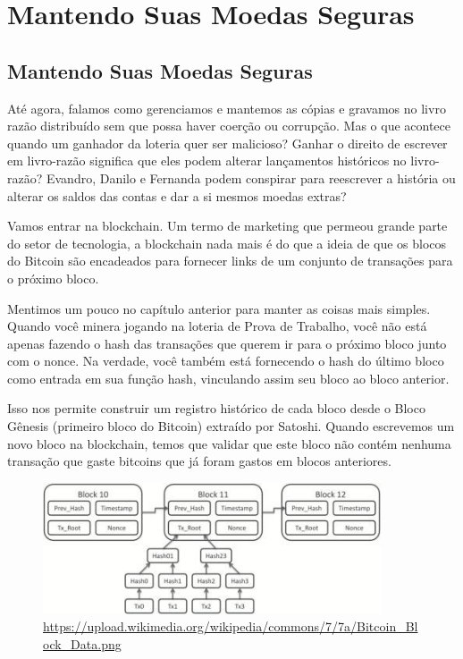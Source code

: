 \part{Mantendo Suas Moedas Seguras}
\label{ch:capitulo6}
\chapter*{Mantendo Suas Moedas Seguras}

Até agora, falamos como gerenciamos e mantemos as cópias e gravamos no livro razão distribuído sem que possa haver coerção ou corrupção. Mas o que acontece quando um ganhador da loteria quer ser malicioso? Ganhar o direito de escrever em livro-razão significa que eles podem alterar lançamentos históricos no livro-razão? Evandro, Danilo e Fernanda podem conspirar para reescrever a história ou alterar os saldos das contas e dar a si mesmos moedas extras?

Vamos entrar na blockchain. Um termo de marketing que permeou grande parte do setor de tecnologia, a blockchain nada mais é do que a ideia de que os blocos do Bitcoin são encadeados para fornecer links de um conjunto de transações para o próximo bloco.

Mentimos um pouco no capítulo anterior para manter as coisas mais simples. Quando você minera jogando na loteria de Prova de Trabalho, você não está apenas fazendo o hash das transações que querem ir para o próximo bloco junto com o nonce. Na verdade, você também está fornecendo o hash do último bloco como entrada em sua função hash, vinculando assim seu bloco ao bloco anterior.

Isso nos permite construir um registro histórico de cada bloco desde o Bloco Gênesis (primeiro bloco do Bitcoin) extraído por Satoshi. Quando escrevemos um novo bloco na blockchain, temos que validar que este bloco não contém nenhuma transação que gaste bitcoins que já foram gastos em blocos anteriores.

\newpage

\begin{figure}
  \centering
  \includegraphics[width=10cm]{imagens/capitulo-06-bloco.jpg}
  \caption{\url{https://upload.wikimedia.org/wikipedia/commons/7/7a/Bitcoin_Block_Data.png}}
\end{figure}

